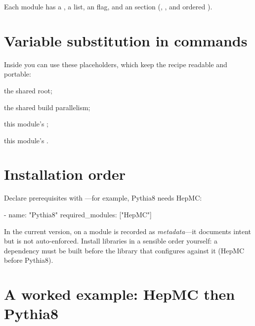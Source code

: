 \noindent Each module has a , a  list, an
 flag, and an  section (,
, and ordered ).

\section{Variable substitution in commands}
\label{sec:lib-vars}

Inside  you can use these placeholders, which keep the recipe
readable and portable:

\begin{description}[style=nextline, leftmargin=1.2em]
  \item[\code{\$\{LibDeps:path\}}] the shared root;
  \item[\code{\$\{LibDeps:make\_paraller\}}] the shared build parallelism;
  \item[\code{\$\{path\}}] this module's ;
  \item[\code{\$\{source\}}] this module's .
\end{description}

\section{Installation order}
\label{sec:lib-order}

Declare prerequisites with ---for example, Pythia8 needs HepMC:

\begin{yamlwin}
- name: "Pythia8"
  required_modules: ["HepMC"]
\end{yamlwin}

\begin{jwarn}
In the current version,  on a  module is recorded as
\emph{metadata}---it documents intent but is not auto-enforced. Install libraries in a sensible
order yourself: a dependency must be built before the library that configures against it (HepMC
before Pythia8).
\end{jwarn}

\section{A worked example: HepMC then Pythia8}
\label{sec:lib-example}

